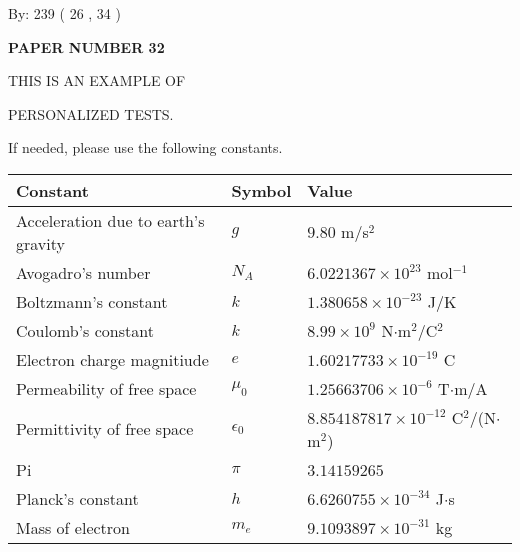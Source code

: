 \documentclass[12pt]{article}
\begin{document}
   
\hspace{1.0in} By: 
         239 (          26 ,           34 )
   
   
   
   
\newpage 
\setcounter{page}{ 
    32001 } 
   
   
   
   
 {\textbf{ \Large{ PAPER NUMBER           32  }}}
   
   
\vspace{0.2in}
   
   
   
   
   
   
   
   
 \vspace{0.2in}
 
 
{\Huge  THIS IS AN EXAMPLE OF}
 
{\Huge  PERSONALIZED TESTS. }
 
If needed, please use the following constants.
 
 
 
\noindent\begin{tabular}{|l|l|l|}
\hline
Constant & Symbol & Value \\
\hline
Acceleration due to earth's gravity &
$g$ &
 $ 9.80 $
m/s$^2$ \\
\hline
Avogadro's number &
$N_A$ &
 $ 6.0221367 \times 10^{23} $
mol$^{-1}$ \\
\hline
Boltzmann's constant &
$k$ &
 $ 1.380658 \times 10^{-23} $
J/K \\
\hline
Coulomb's constant &
$k$ &
 $ 8.99 \times 10^{9} $
N$\cdot $m$^2$/C$^2$ \\
\hline
Electron charge magnitiude &
$e$ &
 $ 1.60217733 \times 10^{-19} $
C \\
\hline
Permeability of free space &
$\mu _0$ &
 $ 1.25663706 \times 10^{-6} $
T$\cdot $m/A \\
\hline
Permittivity of free space &
$\epsilon _0$ &
 $ 8.854187817 \times 10^{-12} $
C$^2$/(N$\cdot $m$^2$) \\
\hline
Pi &
$\pi$ &
 $ 3.14159265 $
$ $ \\
\hline
Planck's constant &
$h$ &
 $ 6.6260755 \times 10^{-34} $
J$\cdot $s \\
\hline
Mass of electron &
$m_e$ &
 $ 9.1093897 \times 10^{-31} $
kg \\
\hline
\end{tabular}
 
\end{document}
